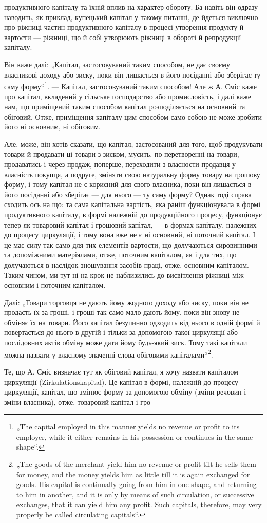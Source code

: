 продуктивного капіталу та їхній вплив на характер обороту. Ба навіть
він одразу наводить, як приклад, купецький капітал у такому питанні,
де йдеться виключно про ріжниці частин продуктивного капіталу
в процесі утворення продукту й вартости — ріжниці, що й собі утворюють
ріжниці в обороті й репродукції капіталу.

Він каже далі: „Капітал, застосовуваний таким способом, не дає своєму
власникові доходу або зиску, поки він лишається в його посіданні або
зберігає ту саму форму“\footnote*{
„The capital employed in this manner yields no revenue or profit to its employer,
while it either remains in his possession or continues in the same shape“.
}. — Капітал, застосовуваний таким способом!
Але ж А. Сміс каже про капітал, вкладений у сільське господарство або
промисловість, і далі каже нам, що приміщений таким способом капітал
розподіляється на основний та обіговий. Отже, приміщення капіталу цим
способом само собою не може зробити його ні основним, ні обіговим.

Але, може, він хотів сказати, що капітал, застосований для того, щоб
продукувати товари й продавати ці товари з зиском, мусить, по перетворенні
на товари, продаватись і через продаж, поперше, переходити з
власности продавця у власність покупця, а подруге, зміняти свою натуральну
форму товару на грошову форму, і тому капітал не є корисний
для свого власника, поки він лишається в його посіданні або зберігає —
для нього — ту саму форму? Однак тоді справа сходить ось на що: та
сама капітальна вартість, яка раніш функціонувала в формі продуктивного
капіталу, в формі належній до продукційного процесу, функціонує
тепер як товаровий капітал і грошовий капітал, — в формах капіталу, належних
до процесу циркуляції, і тому вона вже не є ні основний, ні поточний
капітал. І це має силу так само для тих елементів вартости, що
долучаються сировинними та допоміжними матеріялами, отже, поточним
капіталом, як і для тих, що долучаються в наслідок зношування засобів
праці, отже, основним капіталом. Таким чином, ми тут ні на крок не
наблизились до висвітлення ріжниці між основним і поточним капіталом.

Далі: „Товари торговця не дають йому жодного доходу або зиску,
поки він не продасть їх за гроші, і гроші так само мало дають йому,
поки він знову не обміняє їх на товари. Його капітал безупинно одходить
від нього в одній формі й повертається до нього в другій і тільки
за допомогою такої циркуляції або послідовних актів обміну може дати
йому будь-який зиск. Тому такі капітали можна назвати у власному значенні
слова обіговими капіталами“\footnote*{
„The goods of the merchant yield him no revenue or profit tilt he sells them
for money, and the money yields him as little till it is again exchanged for goods.
His capital is continually going from him in one shape, and returning to him in
another, and it is only by means of such circulation, or successive exchanges, that
it can yield him any profit. Such capitals, therefore, may very properly be called
circulating capitals“.
}.

Те, що А. Сміс визначає тут як обіговий капітал, я хочу назвати
капіталом циркуляції (Zirkulationskapital). Це капітал в формі,
належній до процесу циркуляції, капітал, що змінює форму за допомогою
обміну (зміни речовин і зміни власника), отже, товаровий капітал і гро-